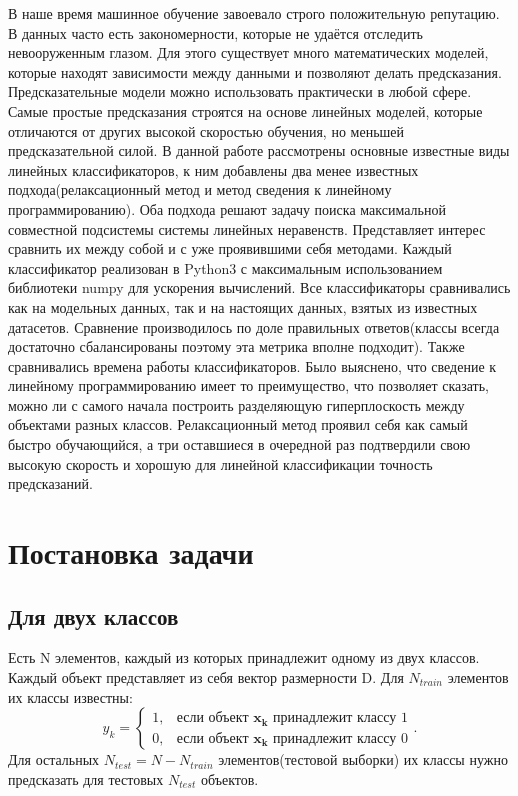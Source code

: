 \documentclass[a4paper]{article}
\newcommand{\yk}{y_k}
\newcommand{\xk}{\bm{x_k}}
\begin{document}
В наше время машинное обучение завоевало строго положительную репутацию. В данных часто есть закономерности, которые не удаётся отследить невооруженным глазом. Для этого существует много математических моделей, которые находят зависимости между данными и позволяют делать предсказания. Предсказательные модели можно использовать практически в любой сфере. Самые простые предсказания строятся на основе линейных моделей, которые отличаются от других высокой скоростью обучения, но меньшей предсказательной силой. В данной работе рассмотрены основные известные виды линейных классификаторов, к ним добавлены два менее известных подхода(релаксационный метод и метод сведения к линейному программированию). Оба подхода решают задачу поиска максимальной совместной подсистемы системы линейных неравенств. Представляет интерес сравнить их между собой и с уже проявившими себя методами. Каждый классификатор реализован в Python3 с максимальным использованием библиотеки numpy для ускорения вычислений. Все классификаторы сравнивались как на модельных данных, так и на настоящих данных, взятых из известных датасетов. Сравнение производилось по доле правильных ответов(классы всегда достаточно сбалансированы поэтому эта метрика вполне подходит). Также сравнивались времена работы классификаторов. Было выяснено, что сведение к линейному программированию имеет то преимущество, что позволяет сказать, можно ли с самого начала построить разделяющую гиперплоскость между объектами разных классов. Релаксационный метод проявил себя как самый быстро обучающийся, а три оставшиеся в очередной раз подтвердили свою высокую скорость и хорошую для линейной классификации точность предсказаний.

\section{Постановка задачи}

\subsection{Для двух классов}
Есть N элементов, каждый из которых принадлежит одному из двух классов. Каждый объект представляет из себя вектор размерности D.  Для $N_{train}$ элементов их классы известны: 
$$\yk = \begin{cases}
1, & \text{если объект } \xk \text{ принадлежит классу 1}\\
0, & \text{если объект } \xk \text{ принадлежит классу 0}
\end{cases}.
$$Для остальных $N_{test} = N - N_{train}$ элементов(тестовой выборки) их классы нужно предсказать для тестовых $N_{test}$ объектов.
\end{document}
